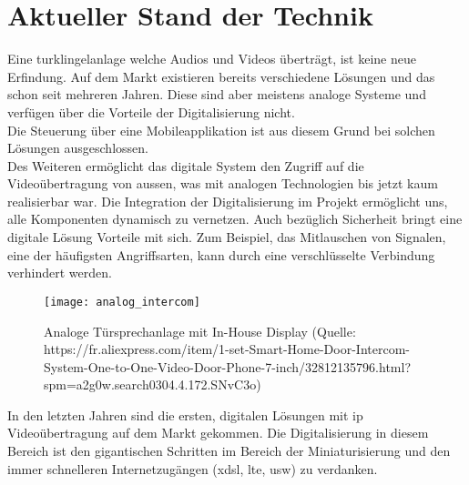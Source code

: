 \section{Aktueller Stand der Technik}
\label{sec:chapterexample}
Eine \gls{turklingelanlage} welche Audios und Videos überträgt, ist keine neue Erfindung. Auf dem Markt existieren bereits verschiedene Lösungen und das schon seit mehreren Jahren. Diese sind aber meistens analoge Systeme und verfügen über die Vorteile der Digitalisierung nicht. 
\\
Die Steuerung über eine Mobileapplikation ist aus diesem Grund bei solchen Lösungen ausgeschlossen.
\\
Des Weiteren ermöglicht das digitale System den Zugriff auf die Videoübertragung von aussen, was mit analogen Technologien bis jetzt kaum realisierbar war.
Die Integration der Digitalisierung im Projekt ermöglicht uns, alle Komponenten dynamisch zu vernetzen. Auch bezüglich Sicherheit bringt eine digitale Lösung Vorteile mit sich. Zum Beispiel, das Mitlauschen von Signalen, eine der häufigsten Angriffsarten, kann durch eine verschlüsselte Verbindung verhindert werden.


\begin{figure}[htb!]
	\begin{center}
		\texttt{[image: analog\_intercom]}
		\caption[Analoge Türsprechanlage mit In-House Display]{Analoge Türsprechanlage mit In-House Display (Quelle: https://fr.aliexpress.com/item/1-set-Smart-Home-Door-Intercom-System-One-to-One-Video-Door-Phone-7-inch/32812135796.html?spm=a2g0w.search0304.4.172.SNvC3o)}
		\label{fig:analoge_intercom}
	\end{center}
\end{figure}
In den letzten Jahren sind die ersten, digitalen Lösungen mit \gls{ip} Videoübertragung auf dem Markt gekommen. Die Digitalisierung in diesem Bereich ist den gigantischen Schritten im Bereich der Miniaturisierung und den immer schnelleren Internetzugängen (x\gls{dsl}, \gls{lte}, usw) zu verdanken.
\\


